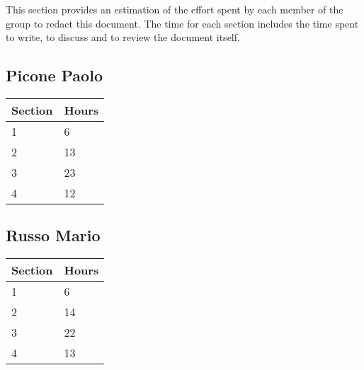 This section provides an estimation of the effort spent by each member of the group to redact this document. The time for each section includes the time spent to write, to discuss and to review the document itself.\\


\subsection*{Picone Paolo}
\begin{tabular}{|p{7cm}|p{7cm}|}
    \hline
    \textbf{Section} & \textbf{Hours}\\
    \hline
    1 & 6\\
    \hline
    2 & 13\\
    \hline
    3 & 23\\
    \hline
    4 & 12\\
    \hline
\end{tabular}


\subsection*{Russo Mario}
\begin{tabular}{|p{7cm}|p{7cm}|}
    \hline
    \textbf{Section} & \textbf{Hours}\\
    \hline
    1 & 6\\
    \hline
    2 & 14\\
    \hline
    3 & 22\\
    \hline
    4 & 13\\
    \hline
\end{tabular}
